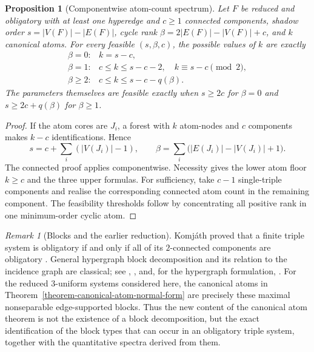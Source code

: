 \documentclass[a4paper,11pt,reqno]{amsart}
\theoremstyle{plain}
\newtheorem{proposition}[theorem]{Proposition}
\theoremstyle{definition}
\theoremstyle{remark}
\newtheorem{remark}[theorem]{Remark}
\begin{document}
\begin{proposition}[Componentwise atom-count spectrum]
\label{proposition-componentwise-atom-count-spectrum}
Let $F$ be reduced and obligatory with at least one hyperedge and $c\ge1$
connected components, shadow order
$s=|V(F)|-|E(F)|$, cycle rank
$\beta=2|E(F)|-|V(F)|+c$, and $k$ canonical atoms.  For every feasible
$(s,\beta,c)$, the possible values of $k$ are exactly
\[
\begin{array}{ll}
\beta=0:
  & k=s-c,\\[1mm]
\beta=1:
  & c\le k\le s-c-2,\quad k\equiv s-c\pmod2,\\[1mm]
\beta\ge2:
  & c\le k\le s-c-q(\beta).
\end{array}
\tag{10.20}
\]
The parameters themselves are feasible exactly when $s\ge2c$ for $\beta=0$
and $s\ge2c+q(\beta)$ for $\beta\ge1$.
\end{proposition}
\begin{proof}
If the atom cores are $J_i$, a forest with $k$ atom-nodes and $c$ components
makes $k-c$ identifications.  Hence
\[
s=c+\sum_i(|V(J_i)|-1),
\qquad
\beta=\sum_i\bigl(|E(J_i)|-|V(J_i)|+1\bigr).
\]
The connected proof applies componentwise.  Necessity gives the lower atom
floor $k\ge c$ and the three upper formulas.  For sufficiency, take $c-1$
single-triple components and realise the corresponding connected atom count
in the remaining component.  The feasibility thresholds follow by
concentrating all positive rank in one minimum-order cyclic atom.
\end{proof}

\begin{remark}[Blocks and the earlier reduction]
\label{remark-komjath-block-reduction}
Komj\'ath proved that a finite triple system is obligatory if and only if all
of its $2$-connected components are obligatory \citep{komjath2001}.  General
hypergraph block decomposition and its relation to the incidence graph are
classical; see \citet{whitney1932}, \citet[Chapter~3]{diestel2017}, and, for the hypergraph formulation, \citet{bahmanian2015}.  For the reduced
$3$-uniform systems considered here, the canonical atoms in
Theorem~\ref{theorem-canonical-atom-normal-form} are precisely these maximal
nonseparable edge-supported blocks.  Thus the new content of the canonical
atom theorem is not the existence of a block decomposition, but the exact
identification of the block types that can occur in an obligatory triple
system, together with the quantitative spectra derived from them.
\end{remark}
\end{document}

